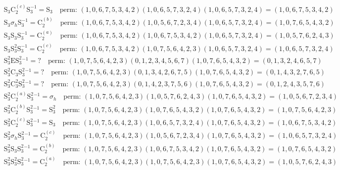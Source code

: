 \begin{align*}
& \mathrm{S}_{3} \mathrm{C}_{2}^{(c)} \mathrm{S}_{3}^{-1} = \mathrm{S}_{3} \quad \text{perm: }(1, 0, 6, 7, 5, 3, 4, 2)(1, 0, 6, 5, 7, 3, 2, 4)(1, 0, 6, 5, 7, 3, 2, 4) = (1, 0, 6, 7, 5, 3, 4, 2) \\
& \mathrm{S}_{3} \sigma_{h} \mathrm{S}_{3}^{-1} = \mathrm{C}_{2}^{(b)} \quad \text{perm: }(1, 0, 6, 7, 5, 3, 4, 2)(1, 0, 5, 6, 7, 2, 3, 4)(1, 0, 6, 5, 7, 3, 2, 4) = (1, 0, 7, 6, 5, 4, 3, 2) \\
& \mathrm{S}_{3} \mathrm{S}_{3} \mathrm{S}_{3}^{-1} = \mathrm{C}_{2}^{(a)} \quad \text{perm: }(1, 0, 6, 7, 5, 3, 4, 2)(1, 0, 6, 7, 5, 3, 4, 2)(1, 0, 6, 5, 7, 3, 2, 4) = (1, 0, 5, 7, 6, 2, 4, 3) \\
& \mathrm{S}_{3} \mathrm{S}_{3}^{2} \mathrm{S}_{3}^{-1} = \mathrm{C}_{2}^{(c)} \quad \text{perm: }(1, 0, 6, 7, 5, 3, 4, 2)(1, 0, 7, 5, 6, 4, 2, 3)(1, 0, 6, 5, 7, 3, 2, 4) = (1, 0, 6, 5, 7, 3, 2, 4) \\
& \mathrm{S}_{3}^{2} \mathrm{E} \mathrm{S}_{3}^{2}^{-1} = ? \quad \text{perm: }(1, 0, 7, 5, 6, 4, 2, 3)(0, 1, 2, 3, 4, 5, 6, 7)(1, 0, 7, 6, 5, 4, 3, 2) = (0, 1, 3, 2, 4, 6, 5, 7) \\
& \mathrm{S}_{3}^{2} \mathrm{C}_{3} \mathrm{S}_{3}^{2}^{-1} = ? \quad \text{perm: }(1, 0, 7, 5, 6, 4, 2, 3)(0, 1, 3, 4, 2, 6, 7, 5)(1, 0, 7, 6, 5, 4, 3, 2) = (0, 1, 4, 3, 2, 7, 6, 5) \\
& \mathrm{S}_{3}^{2} \mathrm{C}_{3}^{2} \mathrm{S}_{3}^{2}^{-1} = ? \quad \text{perm: }(1, 0, 7, 5, 6, 4, 2, 3)(0, 1, 4, 2, 3, 7, 5, 6)(1, 0, 7, 6, 5, 4, 3, 2) = (0, 1, 2, 4, 3, 5, 7, 6) \\
& \mathrm{S}_{3}^{2} \mathrm{C}_{2}^{(a)} \mathrm{S}_{3}^{2}^{-1} = \sigma_{h} \quad \text{perm: }(1, 0, 7, 5, 6, 4, 2, 3)(1, 0, 5, 7, 6, 2, 4, 3)(1, 0, 7, 6, 5, 4, 3, 2) = (1, 0, 5, 6, 7, 2, 3, 4) \\
& \mathrm{S}_{3}^{2} \mathrm{C}_{2}^{(b)} \mathrm{S}_{3}^{2}^{-1} = \mathrm{S}_{3}^{2} \quad \text{perm: }(1, 0, 7, 5, 6, 4, 2, 3)(1, 0, 7, 6, 5, 4, 3, 2)(1, 0, 7, 6, 5, 4, 3, 2) = (1, 0, 7, 5, 6, 4, 2, 3) \\
& \mathrm{S}_{3}^{2} \mathrm{C}_{2}^{(c)} \mathrm{S}_{3}^{2}^{-1} = \mathrm{S}_{3} \quad \text{perm: }(1, 0, 7, 5, 6, 4, 2, 3)(1, 0, 6, 5, 7, 3, 2, 4)(1, 0, 7, 6, 5, 4, 3, 2) = (1, 0, 6, 7, 5, 3, 4, 2) \\
& \mathrm{S}_{3}^{2} \sigma_{h} \mathrm{S}_{3}^{2}^{-1} = \mathrm{C}_{2}^{(c)} \quad \text{perm: }(1, 0, 7, 5, 6, 4, 2, 3)(1, 0, 5, 6, 7, 2, 3, 4)(1, 0, 7, 6, 5, 4, 3, 2) = (1, 0, 6, 5, 7, 3, 2, 4) \\
& \mathrm{S}_{3}^{2} \mathrm{S}_{3} \mathrm{S}_{3}^{2}^{-1} = \mathrm{C}_{2}^{(b)} \quad \text{perm: }(1, 0, 7, 5, 6, 4, 2, 3)(1, 0, 6, 7, 5, 3, 4, 2)(1, 0, 7, 6, 5, 4, 3, 2) = (1, 0, 7, 6, 5, 4, 3, 2) \\
& \mathrm{S}_{3}^{2} \mathrm{S}_{3}^{2} \mathrm{S}_{3}^{2}^{-1} = \mathrm{C}_{2}^{(a)} \quad \text{perm: }(1, 0, 7, 5, 6, 4, 2, 3)(1, 0, 7, 5, 6, 4, 2, 3)(1, 0, 7, 6, 5, 4, 3, 2) = (1, 0, 5, 7, 6, 2, 4, 3) \\
\end{align*}